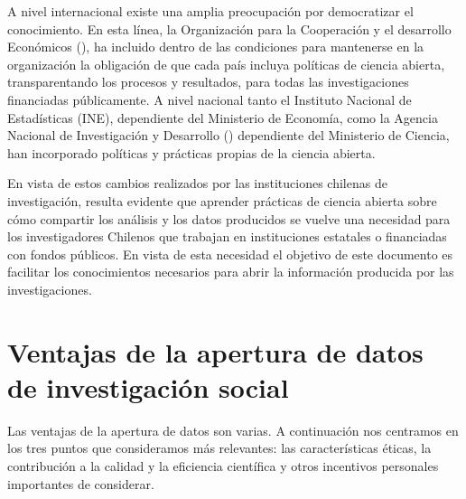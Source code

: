 \documentclass[
  spanish,
  a4paper,
  oneside]{scrbook}
\begin{document}
A nivel internacional existe una amplia preocupación por democratizar el
conocimiento. En esta línea, la Organización para la Cooperación y el
desarrollo Económicos (), ha
incluido dentro de las condiciones para mantenerse en la organización la
obligación de que cada país incluya políticas de ciencia abierta,
transparentando los procesos y resultados, para todas las
investigaciones financiadas públicamente. A nivel nacional tanto el
Instituto Nacional de Estadísticas (INE), dependiente del Ministerio de
Economía, como la Agencia Nacional de Investigación y Desarrollo
() dependiente del Ministerio de
Ciencia, han incorporado políticas y prácticas propias de la ciencia
abierta.

En vista de estos cambios realizados por las instituciones chilenas de
investigación, resulta evidente que aprender prácticas de ciencia
abierta sobre cómo compartir los análisis y los datos producidos se
vuelve una necesidad para los investigadores Chilenos que trabajan en
instituciones estatales o financiadas con fondos públicos. En vista de
esta necesidad el objetivo de este documento es facilitar los
conocimientos necesarios para abrir la información producida por las
investigaciones.

\chapter{Ventajas de la apertura de datos de investigación
social}\label{ventajas-de-la-apertura-de-datos-de-investigaciuxf3n-social}

Las ventajas de la apertura de datos son varias. A continuación nos
centramos en los tres puntos que consideramos más relevantes: las
características éticas, la contribución a la calidad y la eficiencia
científica y otros incentivos personales importantes de considerar.
\end{document}
